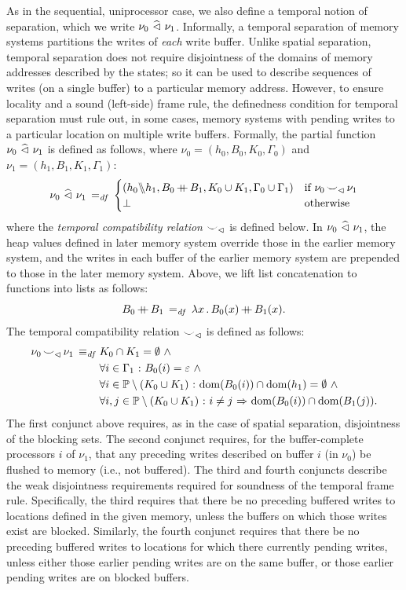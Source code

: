 \documentclass[11pt]{report}
\begin{document}
As in the sequential, uniprocessor case, we also define a temporal notion of separation, which we write $\nu_0 \operatorname{\,\widehat{\vartriangleleft}\,} \nu_1$. Informally, a temporal separation of memory systems partitions the writes of \emph{each} write buffer. Unlike spatial separation, temporal separation does not require disjointness of the domains of memory addresses described by the states; so it can be used to describe sequences of writes (on a single buffer) to a particular memory address. However, to ensure locality and a sound (left-side) frame rule, the definedness condition for temporal separation must rule out, in some cases, memory systems with pending writes to a particular location on multiple write buffers. Formally, the partial function $\nu_0 \operatorname{\,\widehat{\vartriangleleft}\,} \nu_1$ is defined as follows, where $\nu_0 = (h_0,B_0,K_0,\Gamma_0)$ and $\nu_1 = (h_1,B_1,K_1,\Gamma_1)$:
\[ \nu_0 \operatorname{\,\widehat{\vartriangleleft}\,} \nu_1 \operatorname{\;=_{\mathit{df}}\;} \begin{cases}
  (h_0 \backslash\!\!\backslash h_1, B_0 \operatorname{+\!\!\!+} B_1, K_0 \cup K_1, \Gamma_0 \cup \Gamma_1) & \text{if $\nu_0 \operatorname{\smile}_\vartriangleleft \nu_1$} \\ 
  \bot & \text{otherwise}
\end{cases}\] where the \emph{temporal compatibility relation} $\operatorname{\smile}_\vartriangleleft$ is defined below. In $\nu_0 \operatorname{\,\widehat{\vartriangleleft}\,} \nu_1$, the heap values defined in later memory system override those in the earlier memory system, and the writes in each buffer of the earlier memory system are prepended to those in the later memory system. Above, we lift list concatenation to functions into lists as follows: \[ B_0 \operatorname{+\!\!\!+} B_1 \operatorname{\;=_{\mathit{df}}\;} \lambda x\,.\, B_0(x) \operatorname{+\!\!\!+} B_1(x).\]
The temporal compatibility relation $\operatorname{\smile}_\vartriangleleft$ is defined as follows: 
\begin{align*}
\nu_0 \operatorname{\smile}_\vartriangleleft \nu_1 \operatorname{\;\equiv_{\mathit{df}}\;} & K_0 \cap K_1 = \operatorname{\emptyset} \operatorname{\,\wedge\,} \\ 
  & \forall i \in \Gamma_1 \operatorname{\,:\,} B_0(i) = \varepsilon \operatorname{\,\wedge\,} \\ 
  & \forall i \in \mathbb{P} \setminus (K_0 \cup K_1) \operatorname{\,:\,} \operatorname{\mathrm{dom}}(B_0(i)) \cap \operatorname{\mathrm{dom}}(h_1) = \operatorname{\emptyset} \operatorname{\,\wedge\,} \\  
  & \forall i,j \in \mathbb{P} \setminus (K_0 \cup K_1) \operatorname{\,:\,} i \neq j \operatorname{\,\Rightarrow\,} \operatorname{\mathrm{dom}}(B_0(i)) \cap \operatorname{\mathrm{dom}}(B_1(j)). 
\end{align*} The first conjunct above requires, as in the case of spatial separation, disjointness of the blocking sets. The second conjunct requires, for the buffer-complete processors $i$ of $\nu_1$, that any preceding writes described on buffer $i$ (in $\nu_0$) be flushed to memory (i.e., not buffered). The third and fourth conjuncts describe the weak disjointness requirements required for soundness of the temporal frame rule. Specifically, the third requires that there be no preceding buffered writes to locations defined in the given memory, unless the buffers on which those writes exist are blocked. Similarly, the fourth conjunct requires that there be no preceding buffered writes to locations for which there currently pending writes, unless either those earlier pending writes are on the same buffer, or those earlier pending writes are on blocked buffers. 
\end{document}
